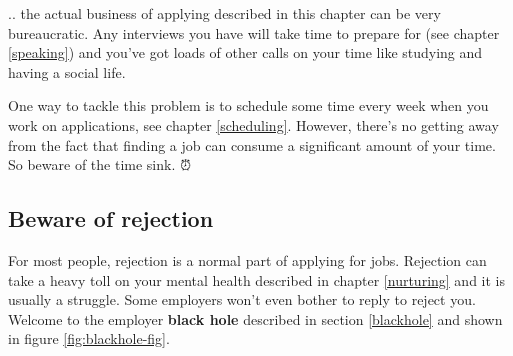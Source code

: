 \documentclass[
]{book}
\begin{document}
.. the actual business of applying described in this chapter can be very bureaucratic. Any interviews you have will take time to prepare for (see chapter \ref{speaking}) and you've got loads of other calls on your time like studying and having a social life.

One way to tackle this problem is to schedule some time every week when you work on applications, see chapter \ref{scheduling}. However, there's no getting away from the fact that finding a job can consume a significant amount of your time. So beware of the time sink. ⏰

\hypertarget{rejection}{%
\subsection{Beware of rejection}\label{rejection}}

For most people, rejection is a normal part of applying for jobs. Rejection can take a heavy toll on your mental health described in chapter \ref{nurturing} and it is usually a struggle. Some employers won't even bother to reply to reject you. Welcome to the employer \textbf{black hole} described in section \ref{blackhole} and shown in figure \ref{fig:blackhole-fig}.
\end{document}
